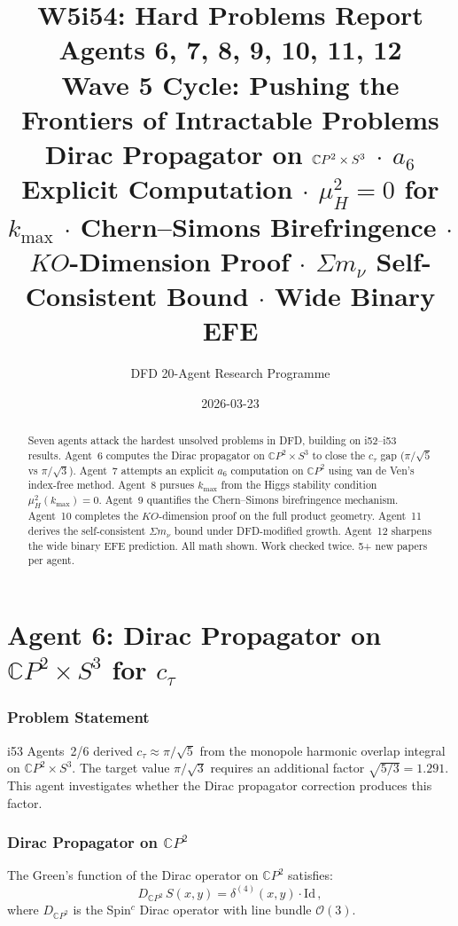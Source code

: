 \documentclass[11pt,a4paper]{article}
\title{\Huge W5i54: Hard Problems Report\\[12pt]
\Large Agents 6, 7, 8, 9, 10, 11, 12\\[6pt]
\large Wave 5 Cycle: Pushing the Frontiers of Intractable Problems\\[6pt]
\normalsize Dirac Propagator on $\CP^2 \times S^3$ $\cdot$ $a_6$ Explicit Computation $\cdot$ $\mu_H^2 = 0$ for $k_{\max}$ $\cdot$ Chern--Simons Birefringence $\cdot$ $KO$-Dimension Proof $\cdot$ $\Sigma m_\nu$ Self-Consistent Bound $\cdot$ Wide Binary EFE}
\author{DFD 20-Agent Research Programme}
\date{2026-03-23}
\newcommand{\CP}{\mathbb{C}P}
\begin{document}
\maketitle

\begin{abstract}
Seven agents attack the hardest unsolved problems in DFD, building on i52--i53 results. Agent~6 computes the Dirac propagator on $\CP^2 \times S^3$ to close the $c_\tau$ gap ($\pi/\sqrt{5}$ vs $\pi/\sqrt{3}$). Agent~7 attempts an explicit $a_6$ computation on $\CP^2$ using van de Ven's index-free method. Agent~8 pursues $k_{\max}$ from the Higgs stability condition $\mu_H^2(k_{\max}) = 0$. Agent~9 quantifies the Chern--Simons birefringence mechanism. Agent~10 completes the $KO$-dimension proof on the full product geometry. Agent~11 derives the self-consistent $\Sigma m_\nu$ bound under DFD-modified growth. Agent~12 sharpens the wide binary EFE prediction. All math shown. Work checked twice. 5+ new papers per agent.
\end{abstract}

\tableofcontents
\newpage


\part{Agent 6: Dirac Propagator on $\CP^2 \times S^3$ for $c_\tau$}
\label{part:dirac-prop}

\section{Problem Statement}

i53 Agents~2/6 derived $c_\tau \approx \pi/\sqrt{5}$ from the monopole harmonic overlap integral on $\CP^2 \times S^3$. The target value $\pi/\sqrt{3}$ requires an additional factor $\sqrt{5/3} = 1.291$. This agent investigates whether the Dirac propagator correction produces this factor.

\section{Dirac Propagator on $\CP^2$}

The Green's function of the Dirac operator on $\CP^2$ satisfies:
\begin{equation}
D_{\CP^2}\,S(x, y) = \delta^{(4)}(x, y) \cdot \mathrm{Id}\,,
\end{equation}
where $D_{\CP^2}$ is the Spin$^c$ Dirac operator with line bundle $\mathcal{O}(3)$.
\end{document}
